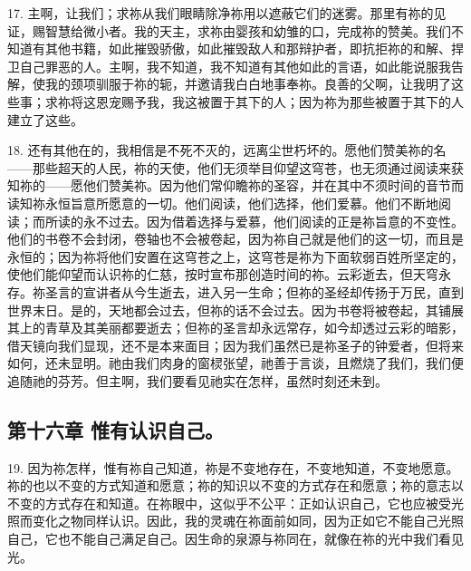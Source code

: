 17. 主啊，让我们；求祢从我们眼睛除净祢用以遮蔽它们的迷雾。那里有祢的见证，赐智慧给微小者。我的天主，求祢由婴孩和幼雏的口，完成祢的赞美。我们不知道有其他书籍，如此摧毁骄傲，如此摧毁敌人和那辩护者，即抗拒祢的和解、捍卫自己罪恶的人。主啊，我不知道，我不知道有其他如此的言语，如此能说服我告解，使我的颈项驯服于祢的轭，并邀请我白白地事奉祢。良善的父啊，让我明了这些事；求祢将这恩宠赐予我，我这被置于其下的人；因为祢为那些被置于其下的人建立了这些。\par

18. 还有其他在的，我相信是不死不灭的，远离尘世朽坏的。愿他们赞美祢的名——那些超天的人民，祢的天使，他们无须举目仰望这穹苍，也无须通过阅读来获知祢的——愿他们赞美祢。因为他们常仰瞻祢的圣容，并在其中不须时间的音节而读知祢永恒旨意所愿意的一切。他们阅读，他们选择，他们爱慕。他们不断地阅读；而所读的永不过去。因为借着选择与爱慕，他们阅读的正是祢旨意的不变性。他们的书卷不会封闭，卷轴也不会被卷起，因为祢自己就是他们的这一切，而且是永恒的；因为祢将他们安置在这穹苍之上，这穹苍是祢为下面软弱百姓所坚定的，使他们能仰望而认识祢的仁慈，按时宣布那创造时间的祢。云彩逝去，但天穹永存。祢圣言的宣讲者从今生逝去，进入另一生命；但祢的圣经却传扬于万民，直到世界末日。是的，天地都会过去，但祢的话不会过去。因为书卷将被卷起，其铺展其上的青草及其美丽都要逝去；但祢的圣言却永远常存，如今却透过云彩的暗影，借天镜向我们显现，还不是本来面目；因为我们虽然已是祢圣子的钟爱者，但将来如何，还未显明。祂由我们肉身的窗棂张望，祂善于言谈，且燃烧了我们，我们便追随祂的芬芳。但主啊，我们要看见祂实在怎样，虽然时刻还未到。\par


\subsection{第十六章 惟有认识自己。}

19. 因为祢怎样，惟有祢自己知道，祢是不变地存在，不变地知道，不变地愿意。祢的也以不变的方式知道和愿意；祢的知识以不变的方式存在和愿意；祢的意志以不变的方式存在和知道。在祢眼中，这似乎不公平：正如认识自己，它也应被受光照而变化之物同样认识。因此，我的灵魂在祢面前如同，因为正如它不能自己光照自己，它也不能自己满足自己。因生命的泉源与祢同在，就像在祢的光中我们看见光。\par

